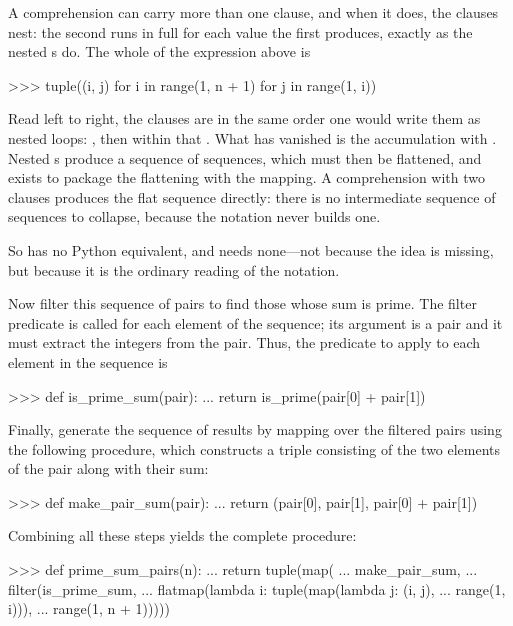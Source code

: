 \noindent
\begin{revealTheSurface}
A comprehension can carry more than one  clause, and when it does,
the clauses nest: the second runs in full for each value the first produces,
exactly as the nested s do.  The whole of the expression above is

\begin{codeBlock}
>>> tuple((i, j) for i in range(1, n + 1) for j in range(1, i))
\end{codeBlock}

\noindent
Read left to right, the clauses are in the same order one would write them as
nested loops: , then within that .  What has vanished
is the accumulation with .  Nested s produce a sequence
of sequences, which must then be flattened, and  exists to
package the flattening with the mapping.  A comprehension with two 
clauses produces the flat sequence directly: there is no intermediate sequence
of sequences to collapse, because the notation never builds one.

So  has no Python equivalent, and needs none---not because the
idea is missing, but because it is the ordinary reading of the notation.
\end{revealTheSurface}

Now filter this sequence of pairs to find those whose sum is prime. The filter
predicate is called for each element of the sequence; its argument is a pair
and it must extract the integers from the pair.  Thus, the predicate to apply
to each element in the sequence is

\begin{codeBlock}
>>> def is_prime_sum(pair):
...     return is_prime(pair[0] + pair[1])
\end{codeBlock}

\noindent
Finally, generate the sequence of results by mapping over the filtered pairs
using the following procedure, which constructs a triple consisting of the two
elements of the pair along with their sum:

\begin{codeBlock}
>>> def make_pair_sum(pair):
...     return (pair[0], pair[1], pair[0] + pair[1])
\end{codeBlock}

\noindent
Combining all these steps yields the complete procedure:

\begin{codeBlock}
>>> def prime_sum_pairs(n):
...     return tuple(map(
...         make_pair_sum,
...         filter(is_prime_sum,
...                flatmap(lambda i: tuple(map(lambda j: (i, j),
...                                            range(1, i))),
...                        range(1, n + 1)))))
\end{codeBlock}

